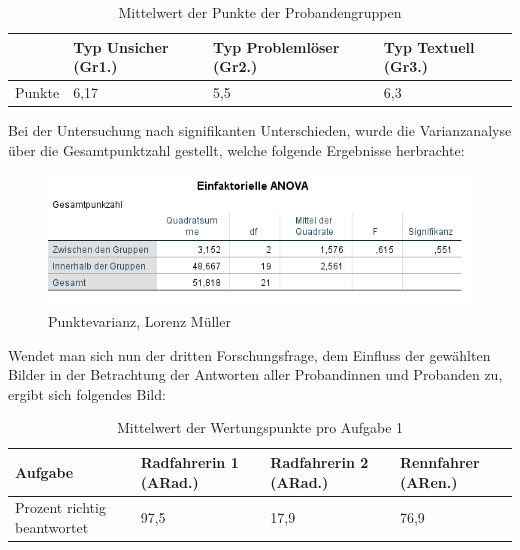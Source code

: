\begin{table}[H]
\hspace{-5pt}
\begin{tabularx}{\textwidth + 5pt}{| @{\hspace{3pt}} M || @{\hspace{3pt}} M  | @{\hspace{3pt}} M | @{\hspace{3pt}} M |}
\hline
\textbf{ } & \textbf{Typ Unsicher (Gr1.)} & \textbf{Typ Problemlöser (Gr2.)} & \textbf{Typ Textuell (Gr3.)}\\
\hline
\hline
Punkte        & 6,17 & 5,5 & 6,3\\
\hline
\end{tabularx}
\caption{Mittelwert der Punkte der Probandengruppen}
\end{table}


Bei der Untersuchung nach signifikanten Unterschieden, wurde
die Varianzanalyse über die Gesamtpunktzahl gestellt, welche folgende Ergebnisse herbrachte:

\begin{figure}[H]
\noindent\hspace{0.5mm}\includegraphics[width=15cm]{./Ressourcen/Punktevarianz.png}
\caption{Punktevarianz, Lorenz Müller}
\end{figure}

Wendet man sich nun der dritten Forschungsfrage, dem Einfluss der gewählten Bilder in der Betrachtung der Antworten aller Probandinnen und Probanden zu, ergibt sich folgendes Bild: 


\begin{table}[H]
\hspace{-5pt}
\begin{tabularx}{\textwidth + 5pt}{| @{\hspace{3pt}} M || @{\hspace{3pt}} M  | @{\hspace{3pt}} M | @{\hspace{3pt}} M |}
\hline
\textbf{Aufgabe} & \textbf{Radfahrerin 1 (ARad.)} & \textbf{Radfahrerin 2 (ARad.)} & \textbf{Rennfahrer (ARen.)} \\
\hline
\hline
Prozent richtig beantwortet       & 97,5 & 17,9 & 76,9 \\
\hline
\end{tabularx}
\caption{Mittelwert der Wertungspunkte pro Aufgabe 1}
\end{table}

